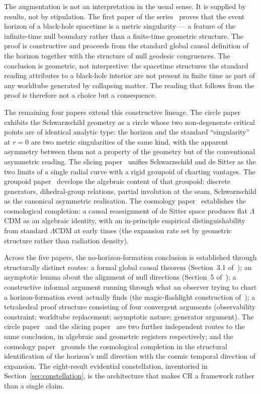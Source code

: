 \documentclass[11pt,a4paper]{article}
\theoremstyle{definition}
\begin{document}
The augmentation is not an interpretation in the usual sense. It is supplied by results, not by stipulation. The first paper of the series~\cite{JanzenBHcausality} proves that the event horizon of a black-hole spacetime is a metric singularity --- a feature of the infinite-time null boundary rather than a finite-time geometric structure. The proof is constructive and proceeds from the standard global causal definition of the horizon together with the structure of null geodesic congruences. The conclusion is geometric, not interpretive: the spacetime structures the standard reading attributes to a black-hole interior are not present in finite time as part of any worldtube generated by collapsing matter. The reading that follows from the proof is therefore not a choice but a consequence.

The remaining four papers extend this constructive lineage. The circle paper~\cite{JanzenCircle} exhibits the Schwarzschild geometry as a circle whose two non-degenerate critical points are of identical analytic type: the horizon and the standard ``singularity'' at $r=0$ are two metric singularities of the same kind, with the apparent asymmetry between them not a property of the geometry but of the conventional asymmetric reading. The slicing paper~\cite{JanzenSlicing} unifies Schwarzschild and de Sitter as the two limits of a single radial curve with a rigid groupoid of charting vantages. The groupoid paper~\cite{JanzenGroupoid} develops the algebraic content of that groupoid: discrete generators, dihedral-group relations, partial involution at the seam, Schwarzschild as the canonical asymmetric realisation. The cosmology paper~\cite{JanzenCRcosmology} establishes the cosmological completion: a causal reassignment of de Sitter space produces flat $\Lambda$CDM as an algebraic identity, with an in-principle empirical distinguishability from standard $\Lambda$CDM at early times (the expansion rate set by geometric structure rather than radiation density).

Across the five papers, the no-horizon-formation conclusion is established through structurally distinct routes: a formal global causal theorem (Section~3.1 of~\cite{JanzenBHcausality}); an asymptotic lemma about the alignment of null directions (Section~5 of~\cite{JanzenBHcausality}); a constructive informal argument running through what an observer trying to chart a horizon-formation event actually finds (the magic-flashlight construction of~\cite{JanzenBHcausality}); a tetrahedral proof structure consisting of four convergent arguments (observability constraint; worldtube replacement; asymptotic nature; generator argument). The circle paper~\cite{JanzenCircle} and the slicing paper~\cite{JanzenSlicing} are two further independent routes to the same conclusion, in algebraic and geometric registers respectively; and the cosmology paper~\cite{JanzenCRcosmology} grounds the cosmological completion in the structural identification of the horizon's null direction with the cosmic temporal direction of expansion. The eight-result evidential constellation, inventoried in Section~\ref{sec:constellation}, is the architecture that makes CR a framework rather than a single claim.
\end{document}
